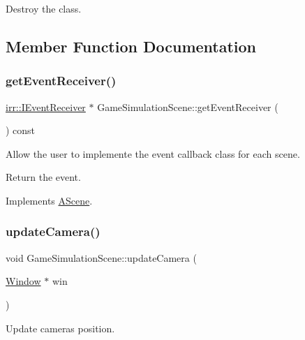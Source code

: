 Destroy the class. 

\subsection{Member Function Documentation}
\mbox{\label{classGameSimulationScene_a048b2a937caff3af7b4d54f8bd404ec1}} 
\subsubsection{\texorpdfstring{get\+Event\+Receiver()}{getEventReceiver()}}
{\footnotesize\ttfamily \hyperlink{classirr_1_1IEventReceiver}{irr\+::\+I\+Event\+Receiver} $\ast$ Game\+Simulation\+Scene\+::get\+Event\+Receiver (\begin{DoxyParamCaption}{ }\end{DoxyParamCaption}) const\hspace{0.3cm}{\ttfamily [virtual]}}



Allow the user to implemente the event callback class for each scene. 

Return the event. 

Implements \hyperlink{classAScene_af521e5e6d30a5d2e5d30eb333e4d3abd}{A\+Scene}.

\mbox{\label{classGameSimulationScene_a66b107f708b5eed87a3c0a0016541d29}} 
\subsubsection{\texorpdfstring{update\+Camera()}{updateCamera()}}
{\footnotesize\ttfamily void Game\+Simulation\+Scene\+::update\+Camera (\begin{DoxyParamCaption}\item[{\hyperlink{classWindow}{Window} $\ast$}]{win }\end{DoxyParamCaption})\hspace{0.3cm}{\ttfamily [virtual]}}



Update camera\textquotesingle{}s position. 


